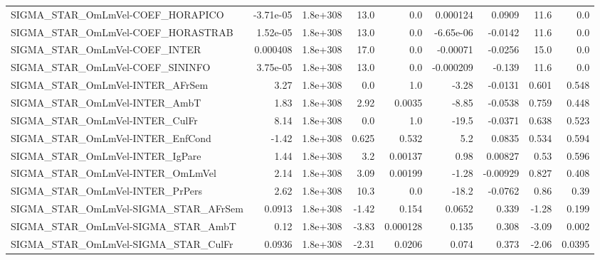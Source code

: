 \begin{tabular}{lrrrrrrrr}
SIGMA\_STAR\_OmLmVel-COEF\_HORAPICO      &   -3.71e-05 &     1.8e+308 &    13.0 &      0.0 &   0.000124 &      0.0909 &         11.6 &           0.0 \\
SIGMA\_STAR\_OmLmVel-COEF\_HORASTRAB     &    1.52e-05 &     1.8e+308 &    13.0 &      0.0 &  -6.65e-06 &     -0.0142 &         11.6 &           0.0 \\
SIGMA\_STAR\_OmLmVel-COEF\_INTER         &    0.000408 &     1.8e+308 &    17.0 &      0.0 &   -0.00071 &     -0.0256 &         15.0 &           0.0 \\
SIGMA\_STAR\_OmLmVel-COEF\_SININFO       &    3.75e-05 &     1.8e+308 &    13.0 &      0.0 &  -0.000209 &      -0.139 &         11.6 &           0.0 \\
SIGMA\_STAR\_OmLmVel-INTER\_AFrSem       &        3.27 &     1.8e+308 &     0.0 &      1.0 &      -3.28 &     -0.0131 &        0.601 &         0.548 \\
SIGMA\_STAR\_OmLmVel-INTER\_AmbT         &        1.83 &     1.8e+308 &    2.92 &   0.0035 &      -8.85 &     -0.0538 &        0.759 &         0.448 \\
SIGMA\_STAR\_OmLmVel-INTER\_CulFr        &        8.14 &     1.8e+308 &     0.0 &      1.0 &      -19.5 &     -0.0371 &        0.638 &         0.523 \\
SIGMA\_STAR\_OmLmVel-INTER\_EnfCond      &       -1.42 &     1.8e+308 &   0.625 &    0.532 &        5.2 &      0.0835 &        0.534 &         0.594 \\
SIGMA\_STAR\_OmLmVel-INTER\_IgPare       &        1.44 &     1.8e+308 &     3.2 &  0.00137 &       0.98 &     0.00827 &         0.53 &         0.596 \\
SIGMA\_STAR\_OmLmVel-INTER\_OmLmVel      &        2.14 &     1.8e+308 &    3.09 &  0.00199 &      -1.28 &    -0.00929 &        0.827 &         0.408 \\
SIGMA\_STAR\_OmLmVel-INTER\_PrPers       &        2.62 &     1.8e+308 &    10.3 &      0.0 &      -18.2 &     -0.0762 &         0.86 &          0.39 \\
SIGMA\_STAR\_OmLmVel-SIGMA\_STAR\_AFrSem  &      0.0913 &     1.8e+308 &   -1.42 &    0.154 &     0.0652 &       0.339 &        -1.28 &         0.199 \\
SIGMA\_STAR\_OmLmVel-SIGMA\_STAR\_AmbT    &        0.12 &     1.8e+308 &   -3.83 & 0.000128 &      0.135 &       0.308 &        -3.09 &         0.002 \\
SIGMA\_STAR\_OmLmVel-SIGMA\_STAR\_CulFr   &      0.0936 &     1.8e+308 &   -2.31 &   0.0206 &      0.074 &       0.373 &        -2.06 &        0.0395 \\

\end{tabular}

